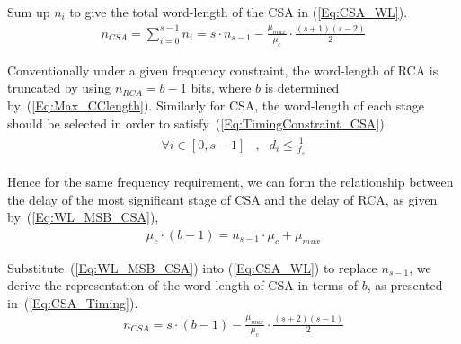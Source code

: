 \documentclass[prodmode,acmtrets]{acmsmall} %
\begin{document}
Sum up $n_i$ to give the total word-length of the CSA in (\ref{Eq:CSA_WL}).
%
\begin{eqnarray}\label{Eq:CSA_WL}
    n_{CSA} =\sum_{i=0}^{s-1}n_{i}= s\cdot n_{s-1}-\frac{\mu_{mux}}{\mu_{c}}\cdot\frac{(s+1)(s-2)}{2}
\end{eqnarray}

Conventionally under a given frequency constraint, the word-length of RCA is truncated by using $n_{RCA}=b-1$ bits, where $b$ is determined by~(\ref{Eq:Max_CClength}). Similarly for CSA, the word-length of each stage should be selected in order to satisfy~(\ref{Eq:TimingConstraint_CSA}).
%
\begin{eqnarray}\label{Eq:TimingConstraint_CSA}
  \begin{matrix}
    \forall i\in[0,s-1] &, & d_i\leqslant\frac{1}{f_s}
  \end{matrix}
\end{eqnarray}

Hence for the same frequency requirement, we can form the relationship between the delay of the most significant stage of CSA and the delay of RCA, as given by~(\ref{Eq:WL_MSB_CSA}),
%
\begin{eqnarray}\label{Eq:WL_MSB_CSA}
    \mu_c\cdot (b-1) = n_{s-1}\cdot\mu_c+\mu_{mux}
\end{eqnarray}

Substitute~(\ref{Eq:WL_MSB_CSA}) into (\ref{Eq:CSA_WL}) to replace $n_{s-1}$, we derive the representation of the word-length of CSA in terms of $b$, as presented in~(\ref{Eq:CSA_Timing}).
%
\begin{eqnarray}\label{Eq:CSA_Timing}
  n_{CSA}=s\cdot (b-1)-\frac{\mu_{mux}}{\mu_{c}}\cdot\frac{(s+2)(s-1)}{2}
\end{eqnarray}
\end{document}
